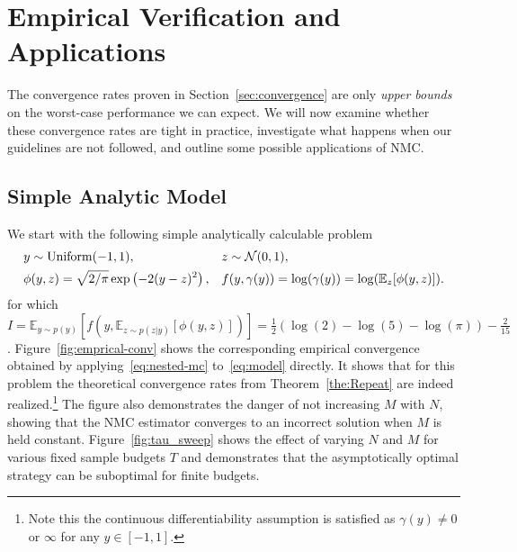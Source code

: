 
\section{Empirical Verification and Applications}
\label{sec:empirical}

The convergence rates proven in Section~\ref{sec:convergence} are only
\emph{upper bounds} on the worst-case performance we can expect. We will now
examine whether these convergence rates are tight in practice, investigate what happens
when our guidelines are not followed, and outline some possible applications of NMC. 

\subsection{Simple Analytic Model}
\label{sec:simple}

We start with the following simple analytically calculable problem
\begin{equation}
\begin{aligned}
\label{eq:model}
& y \sim \mathrm{Uniform}(-1,1), &&
z \sim \mathcal{N}(0,1), \\
& \phi(y,z) = \sqrt{2/\pi}\exp\left(-2(y-z)^2\right), &&
f(y,\gamma(y)) = \log (\gamma (y)) = \log(\mathbb{E}_z[\phi(y,z)]).
\end{aligned}
\end{equation}
for which $I = \mathbb{E}_{y \sim p(y)}\left[f\left(y,\mathbb{E}_{z\sim p(z|y)}\left[\phi(y,z)\right]\right)\right]=\frac{1}{2}\left(\log(2)-\log(5)-\log(\pi)\right)-\frac{2}{15}$.
Figure~\ref{fig:emprical-conv} shows the corresponding empirical convergence obtained by
applying~\eqref{eq:nested-mc} to~\eqref{eq:model} directly. It shows that for this
problem the theoretical convergence rates from Theorem~\ref{the:Repeat} are indeed
realized.\footnote{Note this the continuous differentiability assumption is satisfied as $\gamma(y)\neq0$
or $\infty$ for any $y\in[-1,1]$.}
The figure also demonstrates the danger of not increasing
$M$ with $N$, showing that the NMC estimator converges to an incorrect solution when $M$
is held constant.  Figure~\ref{fig:tau_sweep} shows the effect of varying $N$ and $M$ for various
fixed sample budgets $T$ and demonstrates that the asymptotically optimal strategy can be suboptimal
for finite budgets.

